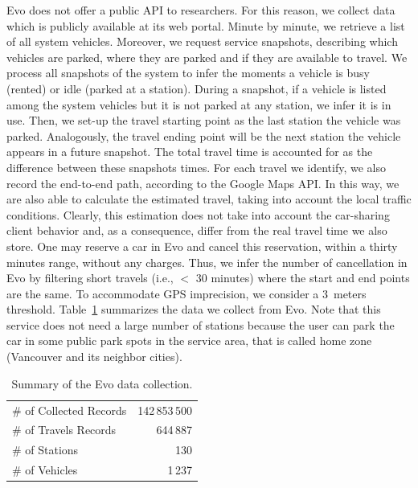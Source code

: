 Evo does not offer a public API to researchers. For this reason, we collect data which is publicly available at its web portal. Minute by minute, we retrieve a list of all system vehicles. Moreover, we request service snapshots, describing which vehicles are parked, where they are parked and if they are available to travel. 
We process all snapshots of the system to infer the moments a vehicle is busy (rented) or idle (parked at a station). During a snapshot, if a vehicle is listed among the system vehicles but it is not parked at any station, we infer it is in use. Then, we set-up the travel starting point as the last station the vehicle was parked. Analogously, the travel ending point will be the next station the vehicle appears in a future snapshot. The total travel time is accounted for as the difference between these snapshots times. 
For each travel we identify, we also record the end-to-end path, according to the Google Maps API. In this way, we are also able to calculate the estimated travel, taking into account the local traffic conditions. Clearly, this estimation does not take into account the car-sharing client behavior and, as a consequence, differ from the real travel time we also store. 
One may reserve a car in Evo and cancel this reservation, within a thirty minutes range, without any charges. Thus, we infer the number of cancellation in Evo by filtering short travels (i.e., $<$ 30 minutes) where the start and end points are the same. To accommodate GPS imprecision, we consider a 3~meters threshold. 
Table~\ref{table:dataEvo} summarizes the data we collect from Evo.
Note that this service does not need a large number of stations because the user can park the car in some public park spots in the service area, that is called home zone (Vancouver and its neighbor cities).

\begin{table}[htb]
\centering
\scriptsize

\begin{tabular}{llr}
\hline
\multicolumn{2}{l}{\# of Collected Records} & 142\,853\,500
\\
\multicolumn{2}{l}{\# of Travels Records} &  644\,887\\
\multicolumn{2}{l}{\# of Stations}  & 130  \\\hline
\multicolumn{2}{l}{\# of Vehicles} & 1\,237
\\\hline
\end{tabular}
\caption{Summary of the Evo data collection.}
\label{table:dataEvo}
\end{table}

